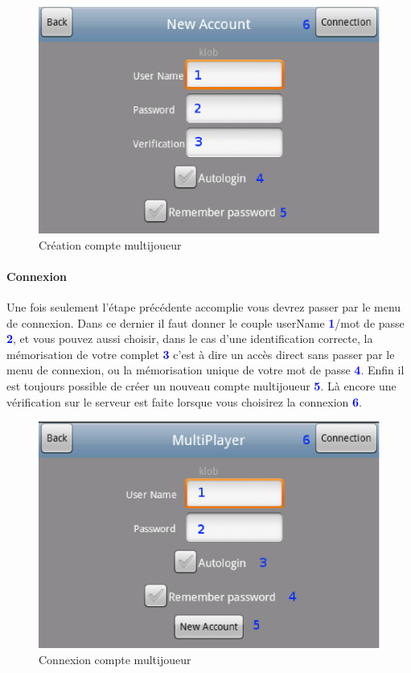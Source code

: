 	
	\begin{figure}[h]
	\centering
		\includegraphics[scale=0.7]{Manuel/Img/18.eps}
		\caption{Création compte multijoueur}
	\end{figure}
	
	\paragraph{Connexion}
		Une fois seulement l'étape précédente accomplie vous devrez passer par le menu
		de connexion. Dans ce dernier il faut donner le couple
		userName \textcolor{blue}{\textbf{1}}/mot de passe
		\textcolor{blue}{\textbf{2}}, et vous pouvez aussi choisir, dans le cas d'une
		identification correcte, la mémorisation de votre complet
		\textcolor{blue}{\textbf{3}} c'est à dire un accès direct sans passer par le
		menu de connexion, ou la mémorisation unique de votre mot de passe
		\textcolor{blue}{\textbf{4}}. Enfin il est toujours possible de créer un
		nouveau compte multijoueur \textcolor{blue}{\textbf{5}}. Là encore une
		vérification sur le serveur est faite lorsque vous choisirez la connexion
		\textcolor{blue}{\textbf{6}}.
		
	\begin{figure}[h]
	\centering
		\includegraphics[scale=0.7]{Manuel/Img/17.eps}
		\caption{Connexion compte multijoueur}
	\end{figure}
	

